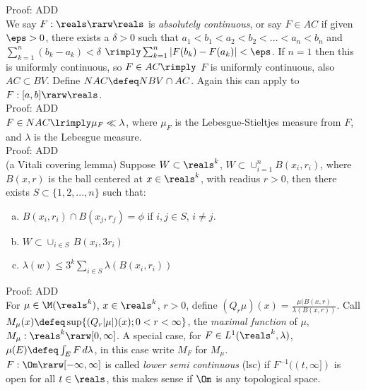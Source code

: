 \noindent
Proof: ADD \\

We say $F: \reals \rarw \reals$ is \emph{absolutely continuous}, or say $F \in AC$ if given $\eps>0$, there exists a $\delta>0$ such that $a_1 < b_1 < a_2 < b_2 < ... < a_n < b_n$ and $\sum_{k=1}^n (b_k-a_k) < \delta$ $\rimply \sum_{k=1}^n |F(b_k) - F(a_k)| < \eps$. If $n=1$ then this is uniformly continuous, so $F \in AC \rimply$ $F$ is uniformly continuous, also $AC \subset BV$. Define $NAC \defeq NBV \cap AC$. Again this can apply to $F: [a,b] \rarw \reals$. \\

\noindent
Proof: ADD \\

$F \in NAC \lrimply \mu_F \ll \lambda$, where $\mu_F$ is the Lebesgue-Stieltjes measure from $F$, and $\lambda$ is the Lebesgue measure. \\


\noindent
Proof: ADD \\



(a Vitali covering lemma) Suppose $W \subset \reals^k$, $W \subset \cup_{i=1}^n B(x_i, r_i)$, where $B(x,r)$ is the ball centered at $x \in \reals^k$, with readius $r>0$, then there exists $S \subset \{ 1,2,...,n\}$ such that:

\begin{enumerate}[a)]
\item
$B(x_i, r_i) \cap B(x_j, r_j) = \phi$ if $i,j \in S$, $i \not = j$.
\item
$ W \subset \cup_{i \in S} \, B(x_i, 3 r_i)$
\item
$ \lambda(w) \le 3^k \sum_{i \in S} \lambda(B(x_i, r_i )) $
\end{enumerate}


\noindent
Proof: ADD \\


For $ \mu \in \M(\reals^k)$, $x \in \reals^k$, $r > 0$, define $(Q_r \mu)(x) = \frac{\mu(B(x,r)}{\lambda(B(x,r))}$. Call $ M_\mu(x) \defeq \sup \{ (Q_r|\mu|)(x); 0 < r < \infty \}$, the \emph{maximal function} of $\mu$, $M_\mu: \reals^k \rarw [0, \infty]$. A special case, for $F \in L^1(\reals^k, \lambda)$, $\mu(E) \defeq \int_E F \, d\lambda$, in this case write $M_F$ for $M_\mu$.  \\


$F: \Om \rarw [-\infty, \infty]$ is called \emph{lower semi continuous} (lsc) if $F^{-1}((t,\infty])$ is open for all $t \in \reals$, this makes sense if $\Om$ is any topological space. \\

